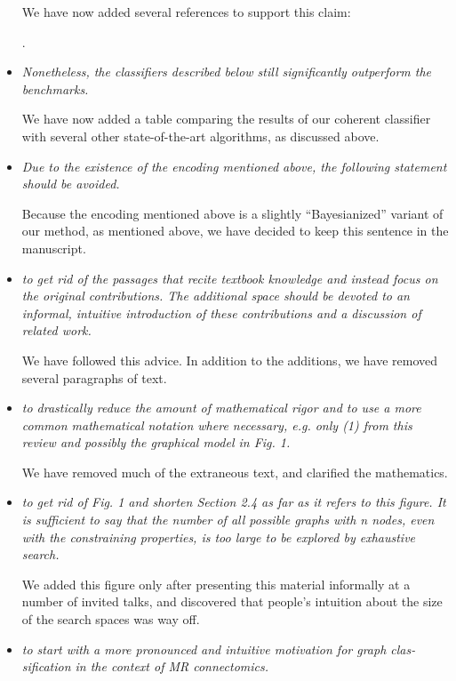 \begin{itemize}
	We have now added several references to support this claim:
	
	.
	
	
	\item \emph{Nonetheless, the classifiers described below still significantly outperform the benchmarks.}
	
	We have now added a table comparing the results of our coherent classifier with several other state-of-the-art algorithms, as discussed above.
	
	\item \emph{Due to the existence of the encoding mentioned above, the following statement should be avoided.}
	
		Because the encoding mentioned above is a slightly ``Bayesianized'' variant of our method, as mentioned above, we have decided to keep this sentence in the manuscript.
		
	\item \emph{to get rid of the passages that recite textbook knowledge and instead focus on the original contributions. The additional space should be devoted to an informal, intuitive introduction of these contributions and a discussion of related work.}
	
	We have followed this advice.  In addition to the additions, we have removed several paragraphs of text.
	
	\item \emph{to drastically reduce the amount of mathematical rigor and to use a more common mathematical notation where necessary, e.g. only (1) from this review and possibly the graphical model in Fig. 1.}
	
	We have removed much of the extraneous text, and clarified the mathematics.
	
	\item \emph{to get rid of Fig. 1 and shorten Section 2.4 as far as it refers to this figure. It is sufficient to say that the number of all possible graphs with n nodes, even with the constraining properties, is too large to be explored by exhaustive search.}
	
	We added this figure only after presenting this material informally at a number of invited talks, and discovered that people's intuition about the size of the search spaces was way off.
	
	\item \emph{to start with a more pronounced and intuitive motivation for graph clas- sification in the context of MR connectomics.}
	

\end{itemize}

